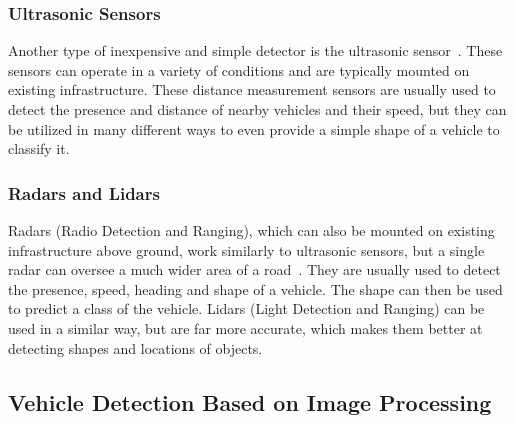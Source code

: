 \subsubsection*{Ultrasonic Sensors}

Another type of inexpensive and simple detector is the ultrasonic
sensor~\cite{UltrasonicSensors}. These sensors can operate in a variety of
conditions and are typically mounted on existing infrastructure. These distance
measurement sensors are usually used to detect the presence and distance of nearby
vehicles and their speed, but they can be utilized in many different ways to
even provide a simple shape of a vehicle to classify it.


\subsubsection*{Radars and Lidars}

Radars (Radio Detection and Ranging), which can also be mounted on existing
infrastructure above ground, work similarly to ultrasonic sensors, but a single
radar can oversee a much wider area of a road~\cite{RadarSensors}. They are
usually used to detect the presence, speed, heading and shape of a vehicle. The
shape can then be used to predict a class of the vehicle. Lidars (Light
Detection and Ranging) can be used in a similar way, but are far more accurate,
which makes them better at detecting shapes and locations of objects.



\subsection{Vehicle Detection Based on Image Processing}






